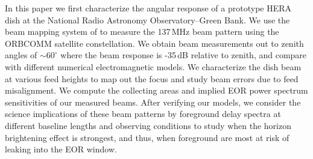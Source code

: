 \documentclass{emulateapj}
\begin{document}

In this paper we first characterize the angular response of a prototype HERA dish at the National Radio 
Astronomy Observatory--Green Bank. We use the beam mapping system of \citet{neben15} to 
measure the 137\,MHz beam pattern using the ORBCOMM satellite constellation. We obtain beam 
measurements out to zenith angles of $\sim60^\circ$ where the beam response is -35\,dB relative to zenith, and compare with different numerical electromagnetic models. We characterize the dish beam at various feed heights to map out the focus and study beam errors due to feed misalignment. We compute the collecting areas and implied EOR power spectrum sensitivities of our measured beams. After verifying our models, we consider the science implications of these 
beam patterns by foreground delay spectra at different baseline lengths and observing conditions to study when the horizon brightening effect is strongest, and thus, when foreground are most at risk of leaking into the EOR window.
\end{document}
